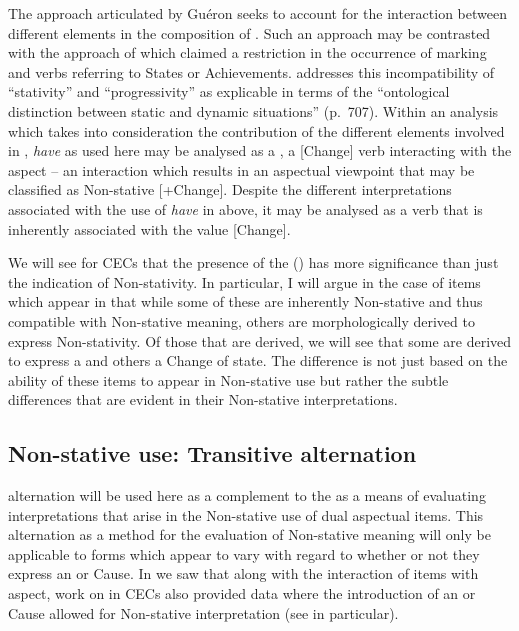 The approach articulated by Guéron seeks to account for the interaction between different elements in the composition of . Such an approach may be contrasted with the approach of \citet{Vendler1967} which claimed a restriction in the occurrence of  marking and verbs referring to States or Achievements. \citet{Lyons1977} addresses this incompatibility of ``stativity'' and ``progressivity'' as explicable in terms of the ``ontological distinction between static and dynamic situations'' (p.~707). Within an analysis which takes into consideration the contribution of the different elements involved in , \textit{have} as used here may be analysed as a , a [\textminus Change] verb interacting with the  aspect -- an interaction which results in an aspectual viewpoint that may be classified as Non-stative [+Change]. Despite  the different interpretations associated with the use of \textit{have} in  above, it may be analysed as a verb that is inherently associated with the value [\textminus Change].

We will see for CECs that the presence of the  () has more significance than just the indication of Non-stativity. In particular, I will argue in the case of items which appear in  that while some of these are inherently Non-stative and thus compatible with Non-stative meaning, others are morphologically derived to express Non-stativity. Of those that are derived, we will see that some are derived to express a  and others a Change of state. The difference is not just based on the ability of these items to appear in Non-stative use but rather the subtle differences that are evident in their Non-stative interpretations. 

\subsection{Non-stative use: Transitive alternation}\label{sec:5.1.2}
 alternation will be used here as a complement to the  as a means of evaluating interpretations that arise in the Non-stative use of dual aspectual items. This alternation as a method for the evaluation of Non-stative meaning will only be applicable to forms which appear to vary with regard to whether or not they express an  or Cause. In  we saw that along with the interaction of items with  aspect, work on  in CECs also provided data where the introduction of an  or Cause allowed for Non-stative interpretation (see  in particular).

